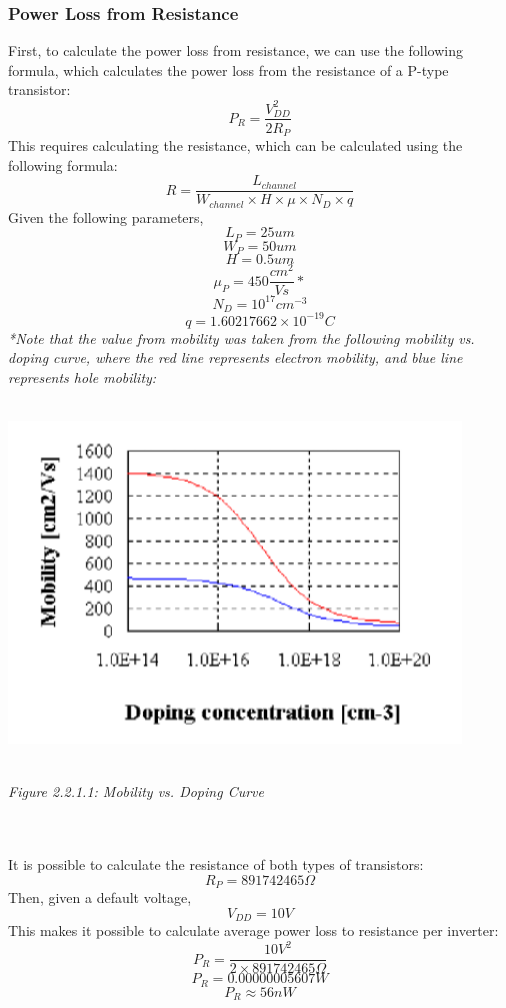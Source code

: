 \documentclass[12pt]{article}
\begin{document}
\subsubsection{Power Loss from Resistance}
First, to calculate the power loss from resistance, we can use the following formula, which calculates the power loss from the resistance of a P-type transistor:
\[P_R = \frac{V_{DD}^2}{2R_P} \]
This requires calculating the resistance, which can be calculated using the following formula:
\[R = \frac{L_{channel}}{W_{channel} \times H \times \mu \times N_D \times q} \]
Given the following parameters,
\[L_P = 25um \]
\[W_P = 50um \]
\[H = 0.5um \]
\[\mu _P = 450\frac{cm^2}{Vs}* \]
\[N_D = 10^{17} cm^{-3}\]
\[q = 1.60217662 × 10^{-19}C \]
\emph{*Note that the value from mobility was taken from the following mobility vs. doping curve, where the red line represents electron mobility, and blue line represents hole mobility:}
\\
\\\centerline{\includegraphics[width=12cm] {Mobility.PNG}}
\begin{center}
\\\emph{Figure 2.2.1.1: Mobility vs. Doping Curve}
\end{center}
\\
\\It is possible to calculate the resistance of both types of transistors:
\[R_P = 891742465 \Omega\]
Then, given a default voltage,
\[V_{DD} = 10V \]
This makes it possible to calculate average power loss to resistance per inverter:
\[P_R = \frac{10V^2}{2 \times 891742465 \Omega} \]
\[P_R = 0.00000005607W \]
\[P_R \approx 56nW \]
\end{document}
